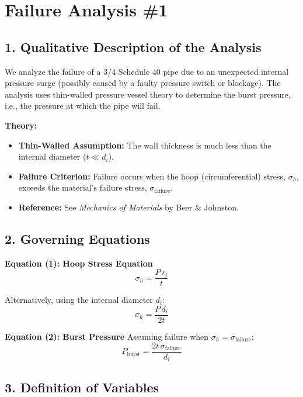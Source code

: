 \documentclass[12pt]{article}
\begin{document}
\newpage
\section*{Failure Analysis \#1}

\subsection*{1. Qualitative Description of the Analysis}
We analyze the failure of a 3/4 Schedule 40 pipe due to an unexpected internal pressure surge (possibly caused by a faulty pressure switch or blockage). The analysis uses thin-walled pressure vessel theory to determine the burst pressure, i.e., the pressure at which the pipe will fail.

\noindent
\textbf{Theory:}
\begin{itemize}
    \item \textbf{Thin-Walled Assumption:} The wall thickness is much less than the internal diameter ($t \ll d_i$).
    \item \textbf{Failure Criterion:} Failure occurs when the hoop (circumferential) stress, $\sigma_h$, exceeds the material's failure stress, $\sigma_{\text{failure}}$.
    \item \textbf{Reference:} See \emph{Mechanics of Materials} by Beer \& Johnston.
\end{itemize}

\subsection*{2. Governing Equations}
\textbf{Equation (1): Hoop Stress Equation}
\begin{equation}
    \sigma_h = \frac{P \, r_i}{t}
    \tag{1}
\end{equation}

Alternatively, using the internal diameter $d_i$:
\begin{equation}
    \sigma_h = \frac{P \, d_i}{2t}
    \tag{1a}
\end{equation}

\noindent\textbf{Equation (2): Burst Pressure}
Assuming failure when $\sigma_h = \sigma_{\text{failure}}$:
\begin{equation}
    P_{\text{burst}} = \frac{2t\, \sigma_{\text{failure}}}{d_i}
    \tag{2}
\end{equation}

\subsection*{3. Definition of Variables}
\end{document}
